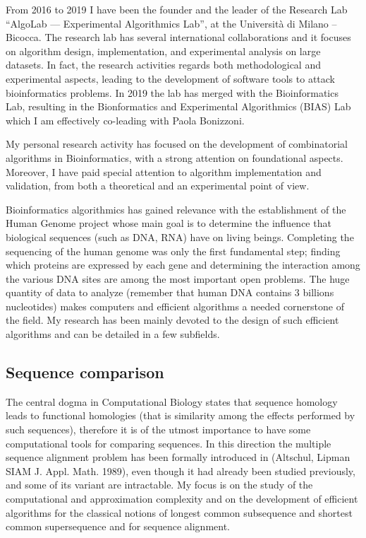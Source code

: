 \documentclass[11pt,a4paper,roman]{moderncv}
\begin{document}
From 2016 to 2019 I have been the founder and the leader of the Research Lab
``AlgoLab --- Experimental Algorithmics Lab'', at the Università di Milano -- Bicocca.
The research lab has several international collaborations and it focuses on
algorithm design, implementation, and experimental analysis on large datasets.
In fact, the research activities regards both methodological and experimental
aspects, leading to the development of software tools to attack bioinformatics
problems.
In 2019 the lab has merged with the Bioinformatics Lab, resulting in the
Bionformatics and Experimental Algorithmics (BIAS) Lab which I am effectively
co-leading with Paola Bonizzoni.


My personal research activity has focused on the development of combinatorial
algorithms in Bioinformatics, with a strong attention on foundational aspects.
Moreover, I have paid special attention to algorithm implementation and validation, from both a theoretical and an experimental point of view.


Bioinformatics algorithmics has gained relevance with the establishment of the
Human Genome project whose main goal is to determine the influence that
biological sequences (such as DNA, RNA) have on living beings.
Completing the sequencing of the human genome was only the first
fundamental step; finding which proteins are expressed by each gene and
determining the interaction among the various DNA sites are among the
most important open problems. The huge quantity of data to
analyze (remember that human DNA contains 3 billions nucleotides) makes
computers and efficient algorithms a needed cornerstone of the field.
My research has been mainly devoted to the design of such
efficient algorithms and can be detailed in a few subfields.

\subsection{Sequence comparison}\label{sequence-comparison}

The central dogma in Computational Biology states that sequence homology
leads to functional homologies (that is similarity among the effects
performed by such sequences), therefore it is of the utmost importance
to have some computational tools for comparing sequences. In this
direction the multiple sequence alignment problem has been formally
introduced in (Altschul, Lipman SIAM J. Appl. Math. 1989), even though
it had already been studied previously, and some of its variant are
intractable. My focus is on the study of the computational and approximation
complexity and on the development of efficient algorithms for the classical
notions of longest common subsequence and shortest common supersequence and for
sequence alignment.
\end{document}
